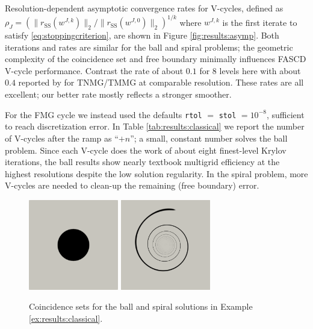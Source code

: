 \documentclass[review,hidelinks,onefignum,onetabnum,final]{siamart220329}  %
\newcommand{\rSS}{r_{\text{SS}}}
\begin{document}
\begin{example}
Resolution-dependent asymptotic convergence rates for V-cycles, defined as $\rho_J=(\|\rSS(w^{J,k})\|_2/\|\rSS(w^{J,0})\|_2)^{1/k}$ where $w^{J,k}$ is the first iterate to satisfy \eqref{eq:stoppingcriterion}, are shown in Figure \ref{fig:results:asymp}.  Both iterations and rates are similar for the ball and spiral problems; the geometric complexity of the coincidence set and free boundary minimally influences FASCD V-cycle performance.  Contrast the rate of about $0.1$ for 8 levels here with about $0.4$ reported by \cite[Figure 7.11]{GraeserKornhuber2009} for TNMG/TMMG at comparable resolution.  These rates are all excellent; our better rate mostly reflects a stronger smoother.

For the FMG cycle we instead used the defaults \texttt{rtol} $=$ \texttt{stol} $= 10^{-8}$, sufficient to reach discretization error.  In Table \ref{tab:results:classical} we report the number of V-cycles after the ramp as ``$+n$''; a small, constant number solves the ball problem.  Since each V-cycle does the work of about eight finest-level Krylov iterations, the ball results show nearly textbook multigrid efficiency at the highest resolutions despite the low solution regularity.  In the spiral problem, more V-cycles are needed to clean-up the remaining (free boundary) error.
\end{example}

\begin{figure}[ht]
\centering
\includegraphics[width=0.35\textwidth]{ball-set.png} \qquad \includegraphics[width=0.35\textwidth]{spiral-set.png}
\caption{Coincidence sets for the ball and spiral solutions in Example \ref{ex:results:classical}.}
\label{fig:results:classical}
\end{figure}
\end{document}
